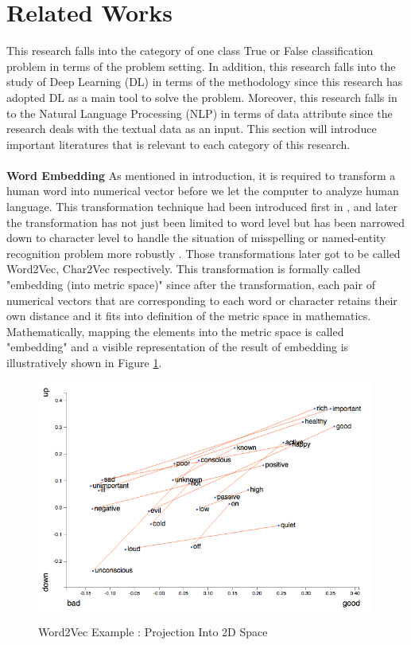 \documentclass[sigconf]{acmart}
\begin{document}
\section{Related Works}
This research falls into the category of one class True or False classification problem in terms of the problem setting. In addition, this research falls into the study of Deep Learning (DL) in terms of the methodology since this research has adopted DL as a main tool to solve the problem. Moreover, this research falls in to the Natural Language Processing (NLP) in terms of data attribute since the research deals with the textual data as an input. This section will introduce important literatures that is relevant to each category of this research. \\\\
\textbf{Word Embedding} As mentioned in introduction, it is required to transform a human word into numerical vector before we let the computer to analyze human language. This transformation technique had been introduced first in \cite{DBLP:journals/corr/MikolovSCCD13}, and later the transformation has not just been limited to word level but has been narrowed down to character level to handle the situation of misspelling or named-entity recognition problem more robustly \cite{DBLP:journals/corr/KimJSR15}. Those transformations later got to be called Word2Vec, Char2Vec respectively. This transformation is formally called "embedding (into metric space)" since after the transformation, each pair of numerical vectors that are corresponding to each word or character retains their own distance and it fits into definition of the metric space in mathematics. Mathematically, mapping the elements into the metric space is called "embedding" and a visible representation of the result of embedding is illustratively shown in Figure \ref{word2vecFig}. 
\begin{figure}
  \includegraphics[width=\linewidth]{word2vec2D.png}
  \caption{Word2Vec Example :  Projection Into 2D Space \cite{word2vec}}
  \label{word2vecFig}
\end{figure}
\end{document}
